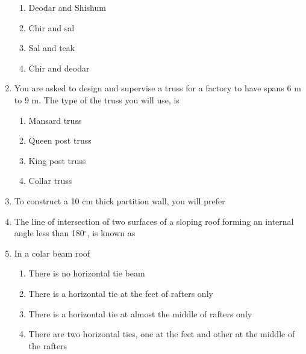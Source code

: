 \documentclass[11pt,a4paper]{article}
\begin{document}
\begin{enumerate}
\begin{enumerate}[label=\Alph*.]
\item{Deodar and Shishum}
\item{Chir and sal}
\item{Sal and teak}
\item{Chir and deodar}
\end{enumerate}
\item{You are asked to design and supervise a truss for a factory to have spans 6 m to 9 m. The type of the truss you will use, is}
\begin{enumerate}[label=\Alph*.]
\item{Mansard truss}
\item{Queen post truss}
\item{King post truss}
\item{Collar truss}
\end{enumerate}
\item{To construct a 10 cm thick partition wall, you will prefer}
\\
\item{The line of intersection of two surfaces of a sloping roof forming an internal angle less than 180$^\circ$, is known as
}
\\
\item{In a colar beam roof}
\begin{enumerate}[label=\Alph*.]
\item{There is no horizontal tie beam}
\item{There is a horizontal tie at the feet of rafters only}
\item{There is a horizontal tie at almost the middle of rafters only}
\item{There are two horizontal ties, one at the feet and other at the middle of the rafters}

\end{enumerate}
\end{enumerate}
\end{document}

